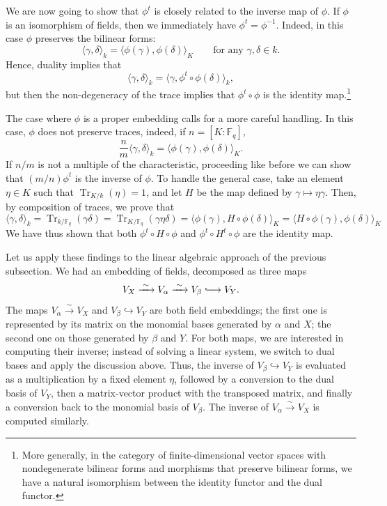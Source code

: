 \documentclass[12pt]{article}
\theoremstyle{plain}
\theoremstyle{definition}
\newcommand{\ang}[1]{\langle#1\rangle}
\DeclareMathOperator{\trace}{Tr} %
\def\F{\ensuremath{\mathbb{F}}}
\begin{document}
We are now going to show that $\phi^t$ is closely related to the
inverse map of $\phi$. %
If $\phi$ is an isomorphism of fields, then we immediately have
$\phi^t=\phi^{-1}$. %
Indeed, in this case $\phi$ preserves the bilinear forms:
\begin{equation*}
  \ang{\gamma,\delta}_k = \ang{\phi(\gamma),\phi(\delta)}_K
  \qquad\text{for any $\gamma,\delta\in k$.}
\end{equation*}
Hence, duality implies that
\begin{equation*}
  \ang{\gamma,\delta}_k = \ang{\gamma,\phi^t\circ\phi(\delta)}_k,
\end{equation*}
but then the non-degeneracy of the trace implies that
$\phi^t\circ\phi$ is the identity map.\footnote{More generally, in the
  category of finite-dimensional vector spaces with nondegenerate
  bilinear forms and morphisms that preserve bilinear forms, we have a
  natural isomorphism between the identity functor and the dual
  functor.}

The case where $\phi$ is a proper embedding calls for a more careful
handling. %
In this case, $\phi$ does not preserve traces, indeed, if $n=[K:\F_q]$,
\begin{equation*}
  \frac{n}{m}\ang{\gamma,\delta}_k = \ang{\phi(\gamma),\phi(\delta)}_K.
\end{equation*}
If $n/m$ is not a multiple of the characteristic, proceeding like
before we can show that $(m/n)\phi^t$ is the inverse of $\phi$. %
To handle the general case, take an element $\eta\in K$ such that
$\trace_{K/k}(\eta)=1$, and let $H$ be the map defined by
$\gamma\mapsto\eta\gamma$. %
Then, by composition of traces, we prove that
\begin{equation*}
  \ang{\gamma,\delta}_k = \trace_{k/\F_q}(\gamma\delta) =
  \trace_{K/\F_q}(\gamma\eta\delta) = \ang{\phi(\gamma),H\circ\phi(\delta)}_K =
  \ang{H\circ\phi(\gamma),\phi(\delta)}_K 
\end{equation*}
We have thus shown that both $\phi^t\circ H\circ\phi$ and
$\phi^t\circ H^t\circ\phi$ are the identity map.

Let us apply these findings to the linear algebraic approach of the
previous subsection. %
We had an embedding of fields, decomposed as three maps
\[V_X \xrightarrow{\;\sim\;} V_\alpha \xrightarrow{\;\sim\;} V_\beta
  \lhook\joinrel\longrightarrow V_Y.\] %
The maps $V_\alpha\xrightarrow{\sim} V_X$ and
$V_\beta\hookrightarrow V_Y$ are both field embeddings; the first one
is represented by its matrix on the monomial bases generated by
$\alpha$ and $X$; the second one on those generated by $\beta$ and
$Y$. %
For both maps, we are interested in computing their inverse; instead
of solving a linear system, we switch to dual bases and apply the
discussion above. %
Thus, the inverse of $V_\beta\hookrightarrow V_Y$ is evaluated as a
multiplication by a fixed element $\eta$, followed by a conversion to
the dual basis of $V_Y$, then a matrix-vector product with the
transposed matrix, and finally a conversion back to the monomial basis
of $V_\beta$. %
The inverse of $V_\alpha\xrightarrow{\sim}V_X$ is computed similarly. %
\end{document}
